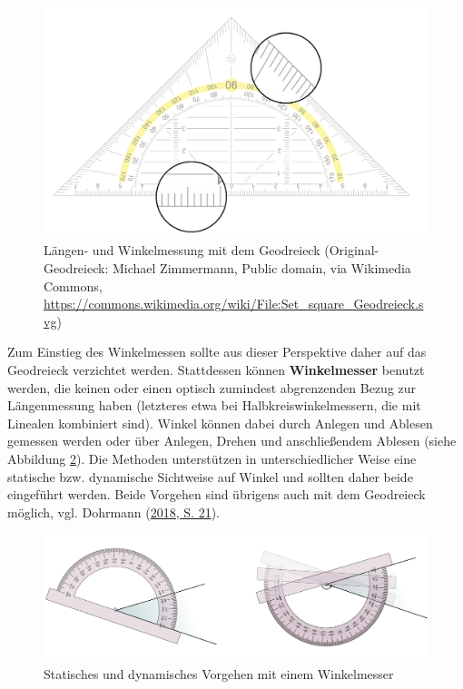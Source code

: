 \documentclass[
]{scrbook}
\theoremstyle{definition}
\theoremstyle{definition}
\theoremstyle{definition}
\theoremstyle{definition}
\theoremstyle{remark}
\begin{document}
\begin{figure}

{\centering \includegraphics[width=0.75\linewidth]{pictures/11-Geodreieck} 

}

\caption{Längen- und Winkelmessung mit dem Geodreieck (Original-Geodreieck: Michael Zimmermann, Public domain, via Wikimedia Commons, \url{https://commons.wikimedia.org/wiki/File:Set_square_Geodreieck.svg})}\label{fig:Geodreieck}
\end{figure}

Zum Einstieg des Winkelmessen sollte aus dieser Perspektive daher auf das Geodreieck verzichtet werden. Stattdessen können \textbf{Winkelmesser} benutzt werden, die keinen oder einen optisch zumindest abgrenzenden Bezug zur Längenmessung haben (letzteres etwa bei Halbkreiswinkelmessern, die mit Linealen kombiniert sind). Winkel können dabei durch Anlegen und Ablesen gemessen werden oder über Anlegen, Drehen und anschließendem Ablesen (siehe Abbildung \ref{fig:Winkelmesser}). Die Methoden unterstützen in unterschiedlicher Weise eine statische bzw. dynamische Sichtweise auf Winkel und sollten daher beide eingeführt werden. Beide Vorgehen sind übrigens auch mit dem Geodreieck möglich, vgl. Dohrmann (\protect\hyperlink{ref-Dohrmann2018}{2018, S. 21}).

\begin{figure}

{\centering \includegraphics[width=0.9\linewidth]{pictures/11-Winkelmesser} 

}

\caption{Statisches und dynamisches Vorgehen mit einem Winkelmesser}\label{fig:Winkelmesser}
\end{figure}
\end{document}
